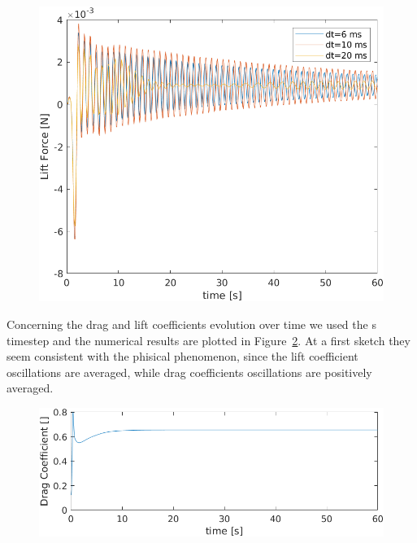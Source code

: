\documentclass[12pt]{article}
\begin{document}
        \begin{figure}[!ht]
                \includegraphics[width=\textwidth]{LiftForce.png}
                \centering
                \caption{}
                \label{fig:lift}
        \end{figure}

Concerning the drag and lift coefficients evolution over time we used the  \:s timestep and the numerical results are plotted  in Figure~\ref{fig:coeff}. At a first sketch they seem consistent with the phisical phenomenon, since the lift coefficient oscillations are  averaged, while drag coefficients oscillations are positively averaged. 

        \begin{figure}[!ht]
                \includegraphics[width=\textwidth]{Coefficients.png}
                \centering
                \caption{}
                \label{fig:coeff}
        \end{figure}
\end{document}
